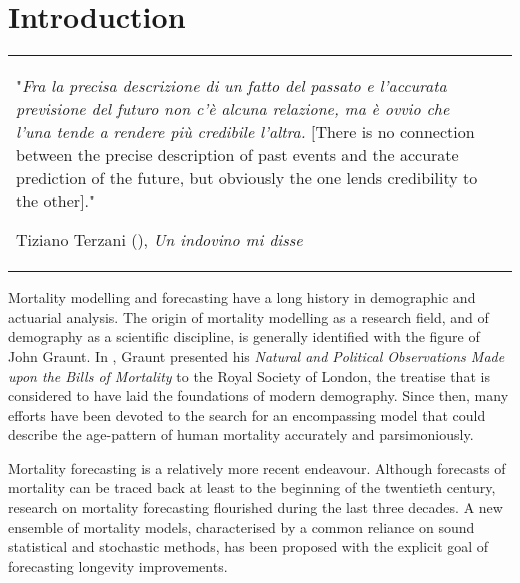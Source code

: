 \documentclass[Thesis]{subfiles}
\begin{document}
	
\chapter{Introduction}

\vspace{-1.2cm}
\begin{tabular}{lr}
	\begin{minipage}{0.4\textwidth}
		\mbox{}
	\end{minipage}
	\begin{minipage}[t]{0.57\textwidth}
		\singlespacing
		\footnotesize
		"\textit{Fra la precisa descrizione di un fatto del passato e l'accurata previsione del futuro non c'\`{e} alcuna relazione, ma \`{e} ovvio che l'una tende a rendere pi\`{u} credibile l'altra.} $[$There is no connection between the precise description of past events and the accurate prediction of the future, but obviously the one lends credibility to the other$]$."
\begin{flushright}
		Tiziano Terzani (\citeyear{terzani1995indovino}), \textit{Un indovino mi disse}
\end{flushright}	
	\end{minipage}
	\vspace{1cm}	
\end{tabular}

\noindent Mortality modelling and forecasting have a long history in demographic and actuarial analysis. The origin of mortality modelling as a research field, and of demography as a scientific discipline, is generally identified with the figure of John Graunt. In \citeyear{graunt1662natural}, Graunt presented his \textit{Natural and Political Observations Made upon the Bills of Mortality} to the Royal Society of London, the treatise that is considered to have laid the foundations of modern demography. Since then, many efforts have been devoted to the search for an encompassing model that could describe the age-pattern of human mortality accurately and parsimoniously. 

Mortality forecasting is a relatively more recent endeavour. Although forecasts of mortality can be traced back at least to the beginning of the twentieth century, research on mortality forecasting flourished during the last three decades. A new ensemble of mortality models, characterised by a common reliance on sound statistical and stochastic methods, has been proposed with the explicit goal of forecasting longevity improvements. 
\end{document}
